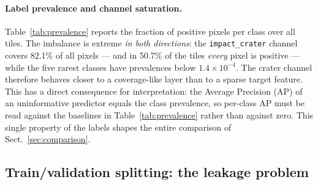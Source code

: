 \documentclass{aa}
\begin{document}
\paragraph{Label prevalence and channel saturation.}
Table~\ref{tab:prevalence} reports the fraction of positive pixels per class over all tiles. The imbalance is extreme \emph{in both directions}: the \texttt{impact\_crater} channel covers 82.1\% of all pixels --- and in 50.7\% of the tiles \emph{every} pixel is positive --- while the five rarest classes have prevalences below $1.4\times10^{-4}$. The crater channel therefore behaves closer to a coverage-like layer than to a sparse target feature. This has a direct consequence for interpretation: the Average Precision (AP) of an uninformative predictor equals the class prevalence, so per-class AP must be read against the baselines in Table~\ref{tab:prevalence} rather than against zero. This single property of the labels shapes the entire comparison of Sect.~\ref{sec:comparison}.

\begin{table}[htbp]
\centering
\caption{Per-class positive-pixel prevalence over the full dataset (15{,}931 tiles, $1.04\times10^9$ pixels per channel). The prevalence is also the AP of an uninformative (chance-level) predictor for that class.}
\label{tab:prevalence}
\end{table}

\subsection{Train/validation splitting: the leakage problem}
\label{sec:splits}
\end{document}
